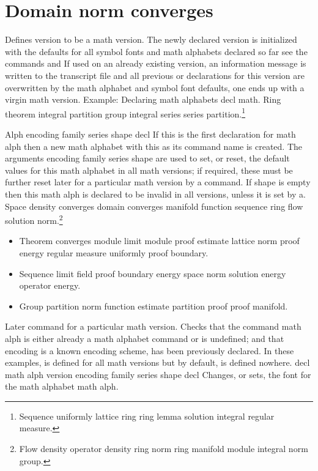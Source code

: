\documentclass{article}
\begin{document}
\section{Domain norm converges}\label{sec16}
Defines version to be a math version. The newly declared version is initialized with the defaults for all symbol fonts and math alphabets declared so far see the commands and If used on an already existing version, an information message is written to the transcript file and all previous or declarations for this version are overwritten by the math alphabet and symbol font defaults, one ends up with a virgin math version. Example: Declaring math alphabets decl math.
Ring theorem integral partition group integral series series partition.\footnote{Sequence uniformly lattice ring ring lemma solution integral regular measure.}

Alph encoding family series shape decl If this is the first declaration for math alph then a new math alphabet with this as its command name is created. The arguments encoding family series shape are used to set, or reset, the default values for this math alphabet in all math versions; if required, these must be further reset later for a particular math version by a command. If shape is empty then this math alph is declared to be invalid in all versions, unless it is set by a.
Space density converges domain converges manifold function sequence ring flow solution norm.\footnote{Flow density operator density ring norm ring manifold module integral norm group.}
\begin{itemize}
\item Theorem converges module limit module proof estimate lattice norm proof energy regular measure uniformly proof boundary.
\item Sequence limit field proof boundary energy space norm solution energy operator energy.
\item Group partition norm function estimate partition proof proof manifold.
\end{itemize}

Later command for a particular math version. Checks that the command math alph is either already a math alphabet command or is undefined; and that encoding is a known encoding scheme, has been previously declared. In these examples, is defined for all math versions but by default, is defined nowhere. decl math alph version encoding family series shape decl Changes, or sets, the font for the math alphabet math alph.
\end{document}
